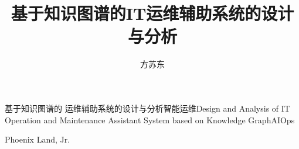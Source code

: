 \title{基于知识图谱的IT运维辅助系统的设计与分析}{基于知识图谱的  运维辅助系统的设计与分析}{}{智能运维}{Design and Analysis of IT Operation and Maintenance Assistant System based on Knowledge Graph}{AIOps}
\author{方苏东}{Phoenix Land, Jr.}
\authorizedate{\today}
\committeechair{}
\reviewer{}{}
\makebigcover
\makecover
